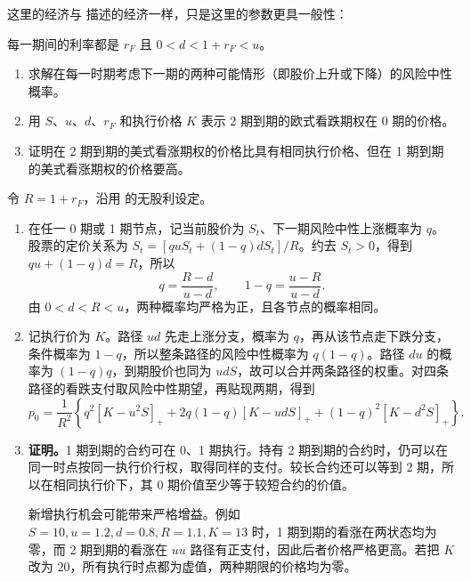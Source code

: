 \begin{problem}
\WJFiveProblem{} 这里的经济与 描述的经济一样，只是这里的参数更具一般性：
\begin{center}
\end{center}
每一期间的利率都是 $r_{F}$ 且 $0<d<1+r_{F}<u$。
\begin{enumerate}[label=(\alph*)]
    \item 求解在每一时期考虑下一期的两种可能情形（即股价上升或下降）的风险中性概率。
    \item 用 $S$、$u$、$d$、$r_{F}$ 和执行价格 $K$ 表示 2 期到期的欧式看跌期权在 0 期的价格。
    \item 证明在 2 期到期的美式看涨期权的价格比具有相同执行价格、但在 1 期到期的美式看涨期权的价格要高。
\end{enumerate}
\end{problem}
\begin{solution}[blank-type=manual,blank-vsep=9\baselineskip]

令 $R=1+r_F$，沿用 的无股利设定。
\begin{enumerate}[label=(\alph*)]
 \item 在任一 0 期或 1 期节点，记当前股价为 $S_t$、下一期风险中性上涨概率为 $q$。股票的定价关系为 $S_t=[q uS_t+(1-q)dS_t]/R$。约去 $S_t>0$，得到 $qu+(1-q)d=R$，所以
\[
 q=\frac{R-d}{u-d},\qquad1-q=\frac{u-R}{u-d}.
\]
 由 $0<d<R<u$，两种概率均严格为正，且各节点的概率相同。
 \item 记执行价为 $K$。路径 $ud$ 先走上涨分支，概率为 $q$，再从该节点走下跌分支，条件概率为 $1-q$，所以整条路径的风险中性概率为 $q(1-q)$。路径 $du$ 的概率为 $(1-q)q$，到期股价也同为 $udS$，故可以合并两条路径的权重。对四条路径的看跌支付取风险中性期望，再贴现两期，得到
 \[
 p_0=\frac1{R^2}\left\{
 q^2[K-u^2S]_++2q(1-q)[K-udS]_++(1-q)^2[K-d^2S]_+
 \right\}.
 \]
 \item \textbf{证明。}1 期到期的合约可在 0、1 期执行。持有 2 期到期的合约时，仍可以在同一时点按同一执行价行权，取得同样的支付。较长合约还可以等到 2 期，所以在相同执行价下，其 0 期价值至少等于较短合约的价值。

 新增执行机会可能带来严格增益。例如 $S=10,u=1.2,d=0.8,R=1.1,K=13$ 时，1 期到期的看涨在两状态均为零，而 2 期到期的看涨在 $uu$ 路径有正支付，因此后者价格严格更高。若把 $K$ 改为 $20$，所有执行时点都为虚值，两种期限的价格均为零。
\end{enumerate}
\end{solution}

